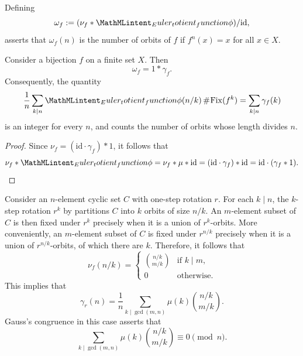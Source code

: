 Defining
\begin{equation*}
  \omega_f:=(\nu_f\ast\totient)/\mathrm{id},
\end{equation*}
 asserts that $\omega_f(n)$ is the number of orbits of $f$ if $f^n(x)=x$ for all $x\in X$. 

\begin{theorem}
  Consider a bijection $f$ on a finite set $X$. Then
  \begin{equation*}
    \omega_f=1\ast \gamma_f.
  \end{equation*}
  Consequently, the quantity
  \begin{equation*}
    \frac{1}{n}\sum_{k\mid n}\totient(n/k)\,\cardinality{\mathrm{Fix}(f^k)}=\sum_{k\mid n}\gamma_f(k)
  \end{equation*}
  is an integer for every $n$, and counts the number of orbits whose length divides $n$.
\end{theorem}

\begin{proof}
  Since $\nu_f=(\mathrm{id}\cdot\gamma_f)\ast 1$, it follows that
  \begin{equation*}
    \nu_f\ast\totient=\nu_f\ast\mu\ast\mathrm{id}=(\mathrm{id}\cdot\gamma_f)\ast\mathrm{id}=\mathrm{id}\cdot(\gamma_f\ast 1).\qedhere
  \end{equation*}
\end{proof}

\begin{example}
  Consider an $n$-element cyclic set $C$ with one-step rotation $r$. For each $k\mid n$, the $k$-step rotation $r^{k}$ by partitions $C$ into $k$ orbits of size $n/k$. An $m$-element subset of $C$ is then fixed under $r^{k}$ precisely when it is a union of $r^k$-orbits. More conveniently, an $m$-element subset of $C$ is fixed under $r^{n/k}$ precisely when it is a union of $r^{n/k}$-orbits, of which there are $k$. Therefore, it follows that
  \begin{equation*}
    \nu_f(n/k)=
    \begin{cases}
      \binom{n/k}{m/k} & \text{if $k\mid m$,}\\
      0 & \text{otherwise.}
    \end{cases}
  \end{equation*}
  This implies that
  \begin{equation*}
    \gamma_r(n)=\frac{1}{n}\sum_{k\mid\gcd(m,n)}\mu(k)\binom{n/k}{m/k}.
  \end{equation*}
  Gauss's congruence in this case asserts that
  \begin{equation*}
    \sum_{k\mid\gcd(m,n)}\mu(k)\binom{n/k}{m/k}\equiv 0\pmod{n}.
  \end{equation*}
\end{example}

